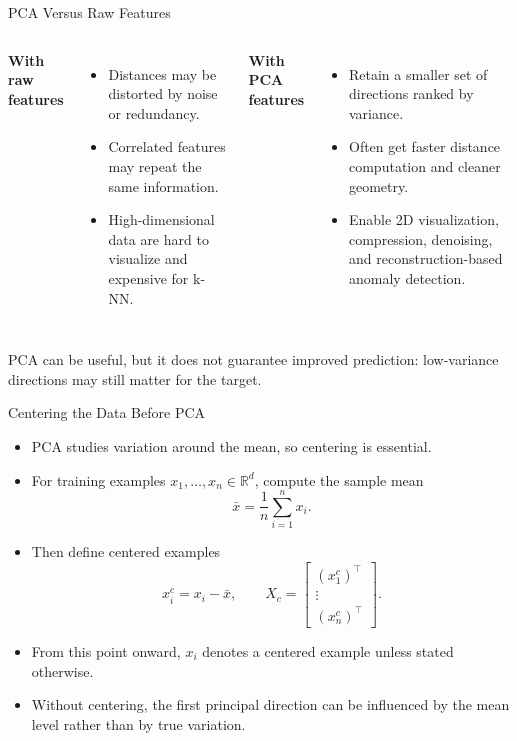 \begin{frame}{PCA Versus Raw Features}
\begin{columns}[T]
\textbf{With raw features}
\begin{itemize}
  \item Distances may be distorted by noise or redundancy.
  \pause
  \item Correlated features may repeat the same information.
  \pause
  \item High-dimensional data are hard to visualize and expensive for k-NN.
\end{itemize}

\pause
{}
\textbf{With PCA features}
\begin{itemize}
  \item Retain a smaller set of directions ranked by variance.
  \pause
  \item Often get faster distance computation and cleaner geometry.
  \pause
  \item Enable 2D visualization, compression, denoising, and reconstruction-based anomaly detection.
\end{itemize}
\end{columns}

\pause
\vspace{0.35em}
\footnotesize PCA can be useful, but it does not guarantee improved prediction: low-variance directions may still matter for the target.
\end{frame}

\begin{frame}{Centering the Data Before PCA}
\begin{itemize}
  \item PCA studies variation around the mean, so centering is essential.
  \pause
  \item For training examples $x_1,\dots,x_n \in \mathbb{R}^d$, compute the sample mean
  \[
    \bar{x}=\frac{1}{n}\sum_{i=1}^n x_i.
  \]
  \pause
  \item Then define centered examples
  \[
    x_i^c = x_i-\bar{x},
    \qquad
    X_c =
    \begin{bmatrix}
      (x_1^c)^\top\\
      \vdots\\
      (x_n^c)^\top
    \end{bmatrix}.
  \]
  \pause
  \item From this point onward, $x_i$ denotes a centered example unless stated otherwise.
  \pause
  \item Without centering, the first principal direction can be influenced by the mean level rather than by true variation.
\end{itemize}
\end{frame}

